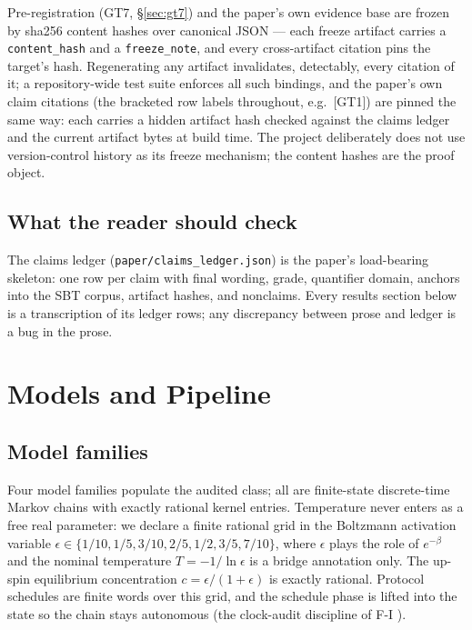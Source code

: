 \documentclass[11pt]{article}
\newcommand{\sbtcite}[1]{\cite{#1}}
\theoremstyle{definition}
\begin{document}
Pre-registration (GT7, \S\ref{sec:gt7}) and the paper's own evidence base are frozen by sha256
content hashes over canonical JSON --- each freeze artifact carries a \texttt{content\_hash} and a
\texttt{freeze\_note}, and every cross-artifact citation pins the target's hash. Regenerating any
artifact invalidates, detectably, every citation of it; a repository-wide test suite enforces all
such bindings, and the paper's own claim citations (the bracketed row labels throughout, e.g.\
[GT1]) are pinned the same way: each carries a hidden artifact hash checked against the claims
ledger and the current artifact bytes at build time. The project deliberately does not use
version-control history as its freeze mechanism; the content hashes are the proof object.

\subsection{What the reader should check}

The claims ledger (\texttt{paper/claims\_ledger.json}) is the paper's load-bearing skeleton: one
row per claim with final wording, grade, quantifier domain, anchors into the SBT corpus, artifact
hashes, and nonclaims. Every results section below is a transcription of its ledger rows; any
discrepancy between prose and ledger is a bug in the prose.
 \section{Models and Pipeline}
\label{sec:models}


\subsection{Model families}

Four model families populate the audited class; all are finite-state discrete-time Markov chains
with exactly rational kernel entries. Temperature never enters as a free real parameter: we
declare a finite rational grid in the Boltzmann activation variable
$\epsilon \in \{1/10, 1/5, 3/10, 2/5, 1/2, 3/5, 7/10\}$, where $\epsilon$ plays the role of
$e^{-\beta}$ and the nominal temperature $T = -1/\ln\epsilon$ is a bridge annotation only. The
up-spin equilibrium concentration $c = \epsilon/(1+\epsilon)$ is exactly rational. Protocol
schedules are finite words over this grid, and the schedule phase is lifted into the state so the
chain stays autonomous (the clock-audit discipline of F-I \sbtcite{sbt-foundations-i}).
\end{document}
